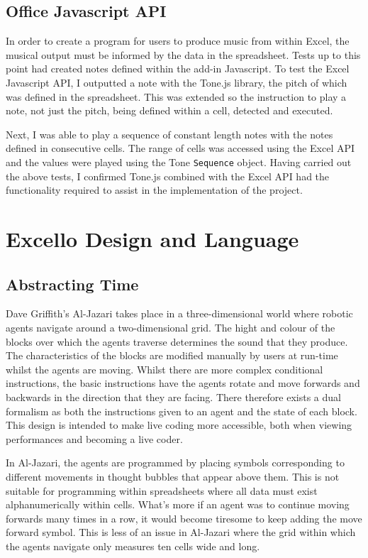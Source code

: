 \documentclass{article}
\begin{document}
\subsection{Office Javascript API}

In order to create a program for users to produce music from within Excel, the musical output must be informed by the data in the spreadsheet. Tests up to this point had created notes defined within the add-in Javascript. To test the Excel Javascript API, I outputted a note with the Tone.js library, the pitch of which was defined in the spreadsheet. This was extended so the instruction to play a note, not just the pitch, being defined within a cell, detected and executed.

Next, I was able to play a sequence of constant length notes with the notes defined in consecutive cells.  The range of cells was accessed using the Excel API and the values were played using the Tone \texttt{Sequence} object. Having carried out the above tests, I confirmed Tone.js combined with the Excel API had the functionality required to assist in the implementation of the project.

\section{Excello Design and Language}

\subsection{Abstracting Time}

Dave Griffith's Al-Jazari \cite{mclean:visualisation} takes place in a three-dimensional world where robotic agents navigate around a two-dimensional grid. The hight and colour of the blocks over which the agents traverse determines the sound that they produce. The characteristics of the blocks are modified manually by users at run-time whilst the agents are moving. Whilst there are more complex conditional instructions, the basic instructions have the agents rotate and move forwards and backwards in the direction that they are facing. There therefore exists a dual formalism as both the instructions given to an agent and the state of each block. This design is intended to make live coding more accessible, both when viewing performances and becoming a live coder.

In Al-Jazari, the agents are programmed by placing symbols corresponding to different movements in thought bubbles that appear above them. This is not suitable for programming within spreadsheets where all data must exist alphanumerically within cells. What's more if an agent was to continue moving forwards many times in a row, it would become tiresome to keep adding the move forward symbol. This is less of an issue in Al-Jazari where the grid within which the agents navigate only measures ten cells wide and long.
\end{document}

